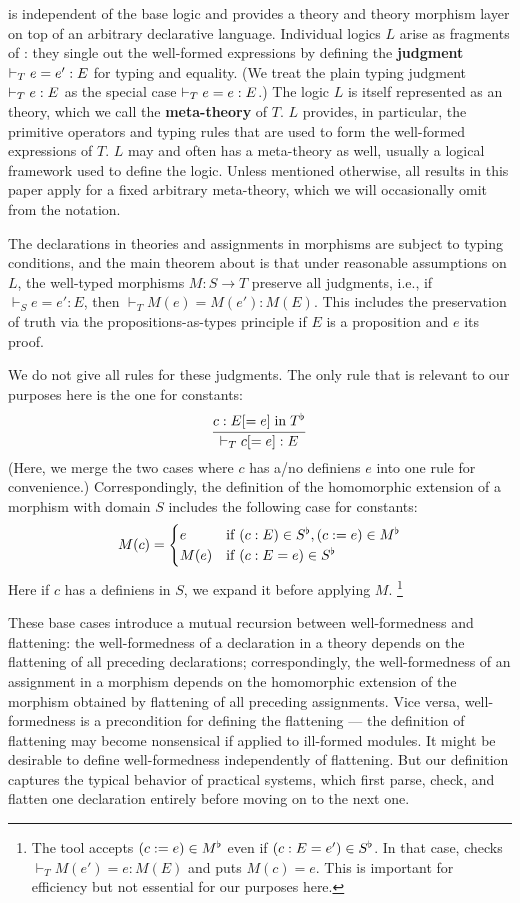 \mmt is independent of the base logic and provides a theory and theory morphism layer on top of an arbitrary declarative language.
Individual logics $L$ arise as fragments of \mmt: they single out the well-formed expressions by defining the \textbf{judgment} $\vdash_T e=e':E$ for typing and equality.
(We treat the plain typing judgment $\vdash_T e:E$ as the special case $\vdash_T e=e:E$.)
The logic $L$ is itself represented as an \mmt theory, which we call the \textbf{meta-theory} of $T$.
$L$ provides, in particular, the primitive operators and typing rules that are used to form the well-formed expressions of $T$.
$L$ may and often has a meta-theory as well, usually a logical framework used to define the logic. 
Unless mentioned otherwise, all results in this paper apply for a fixed arbitrary meta-theory, which we will occasionally omit from the notation.

The declarations in theories and assignments in morphisms are subject to typing conditions, and the main theorem about \mmt is that under reasonable assumptions on $L$, the well-typed morphisms $M:S\to T$ preserve all judgments, i.e., if $\vdash_S e=e':E$, then $\vdash_T M(e)=M(e'):M(E)$.
This includes the preservation of truth via the propositions-as-types principle if $E$ is a proposition and $e$ its proof.

We do not give all rules for these judgments.
The only rule that is relevant to our purposes here is the one for constants:
\[\cfrac{c:E[=e] \;\mathrm{in}\; T^\flat}{\vdash_T c[=e]:E}\,\]
(Here, we merge the two cases where $c$ has a/no definiens $e$ into one rule for convenience.)
Correspondingly, the definition of the homomorphic extension of a morphism with domain $S$ includes the following case for constants:
\[M(c) = \begin{cases}e&\mathrm{if}\; (c:E) \in S^\flat, (c:=e)\in M^\flat \\ M(e) &\mathrm{if}\; (c:E=e)\in S^\flat\end{cases}\]
Here if $c$ has a definiens in $S$, we expand it before applying $M$.%
\footnote{The \mmt tool accepts $(c:=e)\in M^\flat$ even if $(c:E=e')\in S^\flat$. In that case, \mmt checks $\vdash_T M(e')=e:M(E)$ and puts $M(c)=e$. This is important for efficiency but not essential for our purposes here.}

These base cases introduce a mutual recursion between well-formedness and flattening:
the well-formedness of a declaration in a theory depends on the flattening of all preceding declarations;
correspondingly, the well-formedness of an assignment in a morphism depends on the homomorphic extension of the morphism obtained by flattening of all preceding assignments.
Vice versa, well-formedness is a precondition for defining the flattening --- the definition of flattening may become nonsensical if applied to ill-formed modules.
It might be desirable to define well-formedness independently of flattening.
But our definition captures the typical behavior of practical systems, which first parse, check, and flatten one declaration entirely before moving on to the next one.

